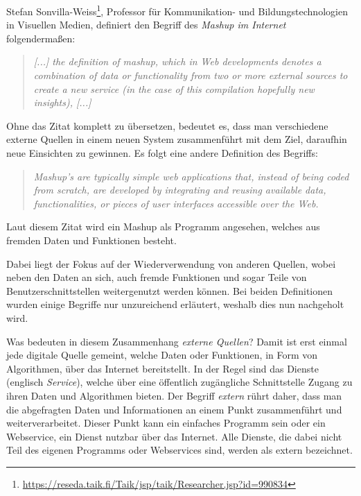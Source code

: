 \documentclass[11pt]{article}
\newcommand{\com}[1]{\marginpar{\em {\small{#1}}}} %
\begin{document}
Stefan Sonvilla-Weiss\footnote{\url{https://reseda.taik.fi/Taik/jsp/taik/Researcher.jsp?id=990834}}, Professor für Kommunikation- und Bildungstechnologien in Visuellen Medien, definiert den Begriff des \textit{Mashup im Internet} folgendermaßen:

%
%
\com{Mashup \\ (Internet)}

%
%
\begin{quote}
    \emph{[...] the definition of mashup, which in Web developments denotes a combination of data or functionality from two or more external sources to create a new service (in the case of this compilation hopefully new insights), [...]} \\ \cite[S. 8]{MASHUP-REMIX-RECOM}
\end{quote}

\noindent 
Ohne das Zitat komplett zu übersetzen, bedeutet es, dass man verschiedene externe Quellen in einem neuen System zusammenführt mit dem Ziel, daraufhin neue Einsichten zu gewinnen. Es folgt eine andere Definition des Begriffs:

%
%
\begin{quote}
    \emph{Mashup's are typically simple web applications that, instead of being coded from scratch, are developed by integrating and reusing available data, functionalities, or pieces of user interfaces accessible over the Web.} \\
    \cite[S. 491]{MASHUP-DEVELOPTOOLS}
\end{quote}

\noindent
Laut diesem Zitat wird ein Mashup als Programm angesehen, welches aus fremden Daten und Funktionen besteht. 

\newpage
\noindent
Dabei liegt der Fokus auf der Wiederverwendung von anderen Quellen, wobei neben den Daten an sich, auch fremde Funktionen und sogar Teile von Benutzerschnittstellen weitergenutzt werden können. Bei beiden Definitionen wurden einige Begriffe nur unzureichend erläutert, weshalb dies nun nachgeholt wird.

Was bedeuten in diesem Zusammenhang \textit{externe Quellen}?\com{Externe\\ Quelle} Damit ist erst einmal jede digitale Quelle gemeint, welche Daten oder Funktionen, in Form von Algorithmen, über das Internet bereitstellt. In der Regel sind das Dienste (englisch \textit{Service}), welche über eine öffentlich zugängliche Schnittstelle Zugang zu ihren Daten und Algorithmen bieten. Der Begriff \textit{extern} rührt daher, dass man die abgefragten Daten und Informationen an einem Punkt zusammenführt und weiterverarbeitet. Dieser Punkt kann ein einfaches Programm sein oder ein Webservice, ein Dienst nutzbar über das Internet. Alle Dienste, die dabei nicht Teil des eigenen Programms oder Webservices sind, werden als extern bezeichnet.
\end{document}
